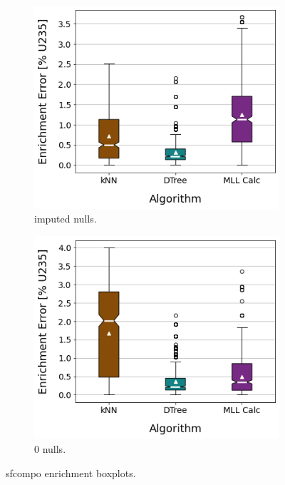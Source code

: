 \begin{figure}[!ht]
  \centering
  \begin{subfigure}[b]{0.49\textwidth}
    \centering
    \includegraphics[width=\textwidth]{./chapters/exp1/sfcompo_boxplots_impnull_enri.png}
    \caption{imputed nulls.}
    \label{fig:enriimp}
  \end{subfigure}
  \hfill
  \begin{subfigure}[b]{0.49\textwidth}
    \centering
    \includegraphics[width=\textwidth]{./chapters/exp1/sfcompo_boxplots_0null_enri.png}
    \caption{0 nulls.}
    \label{fig:enri0}
  \end{subfigure}
  \caption{sfcompo enrichment boxplots.}
  \label{fig:sfcoenri}
\end{figure}


